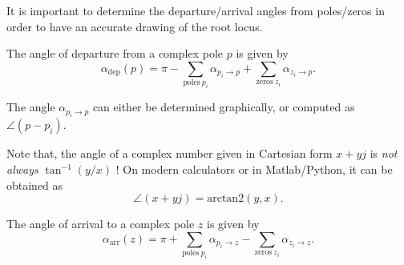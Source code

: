 \documentclass[a4paper,11pt]{report}
\theoremstyle{definition}
\begin{document}
It is important to determine the departure/arrival angles from
poles/zeros in order to have an accurate drawing of the root locus.

The angle of departure from a complex pole $p$ is given by
\[
\alpha_\textrm{dep}(p) = \pi - \sum_{\textrm{poles}\ p_i} \alpha_{p_i \to p} +
\sum_{\textrm{zeros}\ z_i} \alpha_{z_i \to p}.
\]

The angle $\alpha_{p_i \to p}$ can either be determined
graphically, or computed as $\angle (p-p_i)$. 

Note that, the angle of a complex number given in Cartesian form
$x+yj$ is \emph{not always} $\tan^{-1}(y/x)$ ! On modern calculators
or in Matlab/Python, it can be obtained as
\[
\angle (x+yj) = \mathrm{arctan2}(y,x).
\]

The angle of arrival to a complex pole $z$ is given by
\[
\alpha_\textrm{arr}(z) = \pi + \sum_{\textrm{poles}\ p_i} \alpha_{p_i \to z} -
\sum_{\textrm{zeros}\ z_i} \alpha_{z_i \to z}.
\]
\end{document}
